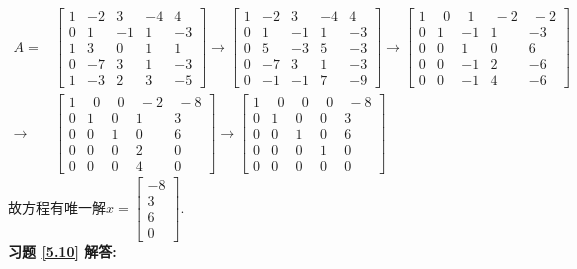 \documentclass[a4paper]{book}
\begin{document}
\begin{displaymath}
\begin{aligned}
A=&\begin{bmatrix}  1&-2&3&-4&4\\0&1&-1&1&-3\\1&3&0&1&1\\0&-7&3&1&-3\\1&-3&2&3&-5 \end{bmatrix}\rightarrow
\begin{bmatrix}1&-2&3&-4&4\\0&1&-1&1&-3\\0&5&-3&5&-3\\0&-7&3&1&-3\\0&-1&-1&7&-9   \end{bmatrix}\rightarrow
\begin{bmatrix}1&\ \ 0&\ \ 1&\ -2&\ -2\\0&1&-1&1&-3\\0&0&1&0&6\\0&0&-1&2&-6\\0&0&-1&4&-6  \end{bmatrix}\\ \rightarrow&
\begin{bmatrix}1&\ \ 0&\ \ 0&\ -2&\ -8\\0&1&0&1&3\\0&0&1&0&6\\0&0&0&2&0\\0&0&0&4&0   \end{bmatrix}\rightarrow
\begin{bmatrix} 1&\ \ 0&\ \ 0&\ \ 0&\ -8\\0&1&0&0&3\\0&0&1&0&6\\0&0&0&1&0\\0&0&0&0&0  \end{bmatrix} \end{aligned} \end{displaymath}
故方程有唯一解$x=\begin{bmatrix}-8\\3\\6\\0\end{bmatrix}$.\\
\textbf{习题 \ref{5.10} 解答:}\\
\end{document}
